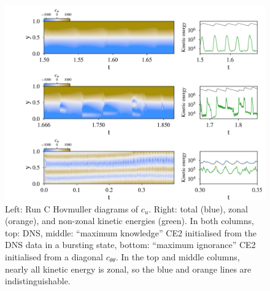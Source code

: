 \documentclass{jfm}
\newcommand{\cu}{c_u}
\newcommand{\ctt}{c_{\theta \theta}}
\begin{document}
\begin{figure}
  \centering
  \includegraphics[width=\textwidth]{run_C_fig.pdf}
  \caption{ Left: Run C Hovmuller diagrams of $\cu$. Right: total (blue), zonal (orange), and non-zonal kinetic energies (green). In both columns, top: DNS, middle: ``maximum knowledge'' CE2 initialised from the DNS data in a bursting state, bottom: ``maximum ignorance'' CE2 initialised from a diagonal $\ctt$. In the top and middle columns, nearly all kinetic energy is zonal, so the blue and orange lines are indistinguishable.}
  \label{fig:run_C}
\end{figure}
\end{document}
